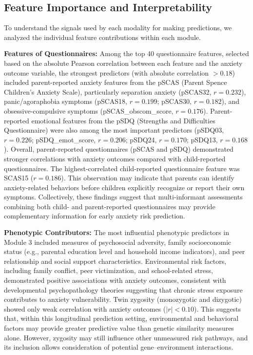 \documentclass[10pt,letterpaper]{article}
\begin{document}
                                                                                                          \subsection*{Feature Importance and Interpretability}

                                                                                                                          To understand the signals used by each modality for making predictions, we analyzed the individual feature contributions within each module.

\textbf{Features of Questionnaires:} Among the top 40 questionnaire features, selected based on the absolute Pearson correlation between each feature and the anxiety outcome variable, the strongest predictors (with absolute correlation $> 0.18$) included parent-reported anxiety features from the pSCAS (Parent Spence Children's Anxiety Scale), particularly separation anxiety (pSCAS32, $r = 0.232$), panic/agoraphobia symptoms (pSCAS18, $r = 0.199$; pSCAS30, $r = 0.182$), and obsessive-compulsive symptoms (pSCAS\_obscom\_score, $r = 0.176$). Parent-reported emotional features from the pSDQ (Strengths and Difficulties Questionnaire) were also among the most important predictors (pSDQ03, $r = 0.226$; pSDQ\_emot\_score, $r = 0.206$; pSDQ24, $r = 0.170$; pSDQ13, $r = 0.168$). Overall, parent-reported questionnaires (pSCAS and pSDQ) demonstrated stronger correlations with anxiety outcomes compared with child-reported questionnaires. The highest-correlated child-reported questionnaire feature was SCAS15 ($r = 0.186$). This observation may indicate that parents can identify anxiety-related behaviors before children explicitly recognize or report their own symptoms. Collectively, these findings suggest that multi-informant assessments combining both child- and parent-reported questionnaires may provide complementary information for early anxiety risk prediction.

\textbf{Phenotypic Contributors:} The most influential phenotypic predictors in Module 3 included measures of psychosocial adversity, family socioeconomic status (e.g., parental education level and household income indicators), and peer relationship and social support characteristics. Environmental risk factors, including family conflict, peer victimization, and school-related stress, demonstrated positive associations with anxiety outcomes, consistent with developmental psychopathology theories suggesting that chronic stress exposure contributes to anxiety vulnerability. Twin zygosity (monozygotic and dizygotic) showed only weak correlation with anxiety outcomes ($|r| < 0.10$). This suggests that, within this longitudinal prediction setting, environmental and behavioral factors may provide greater predictive value than genetic similarity measures alone. However, zygosity may still influence other unmeasured risk pathways, and its inclusion allows consideration of potential gene--environment interactions.
\end{document}
